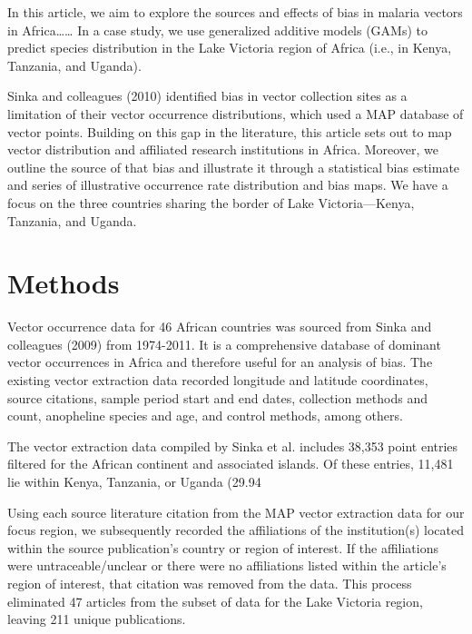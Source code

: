 \documentclass[sn-nature]{sn-jnl}%
\begin{document}
{In this article, we aim to explore the sources and effects of bias in malaria vectors in Africa…… In a case study, we use generalized additive models (GAMs) to predict species distribution in the Lake Victoria region of Africa (i.e., in Kenya, Tanzania, and Uganda).

Sinka and colleagues (2010) identified bias in vector collection sites as a limitation of their vector occurrence distributions, which used a MAP database of vector points. Building on this gap in the literature, this article sets out to map vector distribution and affiliated research institutions in Africa. Moreover, we outline the source of that bias and illustrate it through a statistical bias estimate and series of illustrative occurrence rate distribution and bias maps. We have a focus on the three countries sharing the border of Lake Victoria—Kenya, Tanzania, and Uganda. 

\section{Methods}\label{methods}
Vector occurrence data for 46 African countries was sourced from Sinka and colleagues (2009) from 1974-2011. It is a comprehensive database of dominant vector occurrences in Africa and therefore useful for an analysis of bias. The existing vector extraction data recorded longitude and latitude coordinates, source citations, sample period start and end dates, collection methods and count, anopheline species and age, and control methods, among others. 

The vector extraction data compiled by Sinka et al. includes 38,353 point entries filtered for the African continent and associated islands. Of these entries, 11,481 lie within Kenya, Tanzania, or Uganda (29.94%

Using each source literature citation from the MAP vector extraction data for our focus region, we subsequently recorded the affiliations of the institution(s) located within the source publication’s country or region of interest. If the affiliations were untraceable/unclear or there were no affiliations listed within the article’s region of interest, that citation was removed from the data. This process eliminated 47 articles from the subset of data for the Lake Victoria region, leaving 211 unique publications. 

}
\end{document}
